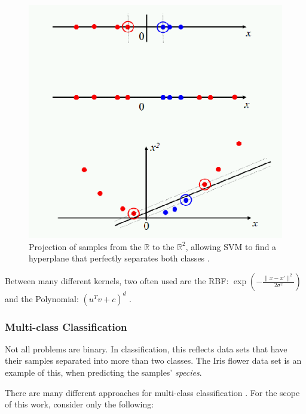 \documentclass[12pt]{article}
\begin{document}
\begin{figure}[H]
	\centering
	\captionsetup{justification=centering}

	\includegraphics[scale=.4]{svm_kernel}
	\caption{Projection of samples from the $\mathbb{R}$ to the $\mathbb{R}^2$, allowing SVM to find a hyperplane that perfectly separates both classes \cite{svmkernels}.}
	\label{fig:svmkernel}
\end{figure}

Between many different kernels, two often used are the RBF: $\exp(-\frac{\|x -x'\|^2}{2\sigma^2})$ and the Polynomial: $(u^T v + c)^{d}$ \cite{svmkernels}.

\subsubsection{Multi-class Classification}

Not all problems are binary. In classification, this reflects data sets that have their samples separated into more than two classes. The Iris flower data set is an example of this, when predicting the samples' {\em species}.

There are many different approaches for multi-class classification \cite{rif2008}. For the scope of this work, consider only the following:
\end{document}
